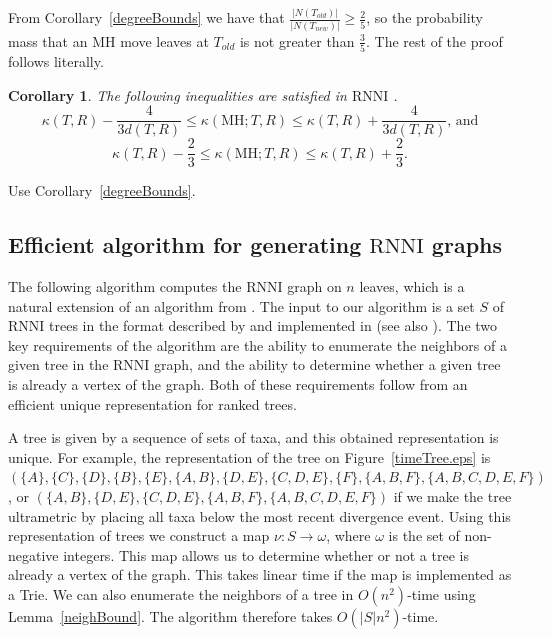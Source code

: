 \documentclass[11pt]{amsart}
\newtheorem{corollary}[lemma]{Corollary}
\theoremstyle{definition}
\newcommand{\rnni}{\mathrm{RNNI}}
\newcommand{\MH}{\mathrm{MH}}
\begin{document}
{\proof
From Corollary~\ref{degreeBounds} we have that $\frac{|N(T_{old})|}{|N(T_{new})|} \geq \frac{2}{5}$, so the probability mass that an MH move leaves at $T_{old}$ is not greater than $\frac35$.
The rest of the proof follows \autocite[][Proof of Lemma~V.8]{Whidden2015-es} literally.
\endproof

\begin{corollary}
The following inequalities are satisfied in $\rnni$ .
\[
\kappa(T,R) - \dfrac{4}{3d(T,R)} \leq \kappa(\MH;T,R) \leq \kappa(T,R) +
\dfrac{4}{3d(T,R)}\mbox{, and}
\]
\[
\kappa(T,R) - \dfrac23 \leq \kappa(\MH;T,R) \leq \kappa(T,R) + \dfrac23.
\]
\end{corollary}

\proof
Use Corollary~\ref{degreeBounds}.
\endproof
}{}


\subsection{Efficient algorithm for generating $\rnni$ graphs}

The following algorithm computes the $\rnni$ graph on $n$ leaves, which is a natural extension of an algorithm from \textcite{Whidden2015-es}.
The input to our algorithm is a set $S$ of $\rnni$ trees in the format described by \textcite{Gavryushkin2014-bw} and implemented in \autocite{tauGeodesic} (see also \autocite{Semple2003-nj}).
The two key requirements of the algorithm are the ability to enumerate the neighbors of a given tree in the $\rnni$ graph, and the ability to determine whether a given tree is already a vertex of the graph.
Both of these requirements follow from an efficient unique representation for ranked trees.

A tree is given by a sequence of sets of taxa, and this obtained representation is unique.
For example, the representation of the tree on Figure~\ref{timeTree.eps} is $(\{A\}, \{C\}, \{D\}, \{B\}, \{E\}, \{A,B\}, \{D,E\}, \{C, D, E\}, \{F\}, \{A,B,F\}, \{A,B,C,D,E,F\})$, or
$(\{A,B\}, \{D,E\}, \{C, D, E\}, \{A,B,F\}, \{A,B,C,D,E,F\})$ if we make the tree ultrametric by placing all taxa below the most recent divergence event.
Using this representation of trees we construct a map $\nu : S \to \omega$, where $\omega$ is the set of non-negative integers.
This map allows us to determine whether or not a tree is already a vertex of the graph.
This takes linear time if the map is implemented as a Trie.
We can also enumerate the neighbors of a tree in $O(n^2)$-time using Lemma~\ref{neighBound}.
The algorithm therefore takes $O(|S|n^2)$-time.
\end{document}
